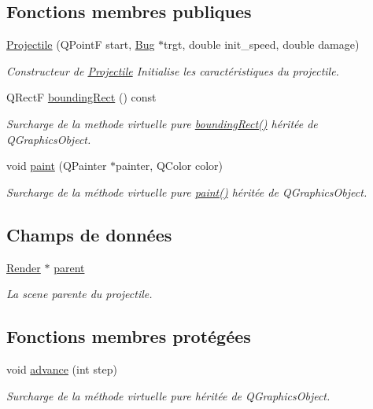 \subsection*{Fonctions membres publiques}
\begin{DoxyCompactItemize}
\item 
\hyperlink{classProjectile_adb1e35e75922feb87c3391f549d3274f}{Projectile} (QPointF start, \hyperlink{classBug}{Bug} $\ast$trgt, double init\_\-speed, double damage)
\begin{DoxyCompactList}\small\item\em Constructeur de \hyperlink{classProjectile}{Projectile} Initialise les caractéristiques du projectile. \end{DoxyCompactList}\item 
QRectF \hyperlink{classProjectile_a0e0b18909c9c154404384707c6515802}{boundingRect} () const 
\begin{DoxyCompactList}\small\item\em Surcharge de la methode virtuelle pure \hyperlink{classProjectile_a0e0b18909c9c154404384707c6515802}{boundingRect()} héritée de QGraphicsObject. \end{DoxyCompactList}\item 
void \hyperlink{classProjectile_aef0d6ffcea7620988cf5446d0c1133fa}{paint} (QPainter $\ast$painter, QColor color)
\begin{DoxyCompactList}\small\item\em Surcharge de la méthode virtuelle pure \hyperlink{classProjectile_aef0d6ffcea7620988cf5446d0c1133fa}{paint()} héritée de QGraphicsObject. \end{DoxyCompactList}\end{DoxyCompactItemize}
\subsection*{Champs de données}
\begin{DoxyCompactItemize}
\item 
\hyperlink{classRender}{Render} $\ast$ \hyperlink{classProjectile_a04924a3bccf3393aaa0f57d9384f617d}{parent}
\begin{DoxyCompactList}\small\item\em La scene parente du projectile. \end{DoxyCompactList}\end{DoxyCompactItemize}
\subsection*{Fonctions membres protégées}
\begin{DoxyCompactItemize}
\item 
void \hyperlink{classProjectile_a8e3b4bae49558a0febfce8c1accea72d}{advance} (int step)
\begin{DoxyCompactList}\small\item\em Surcharge de la méthode virtuelle pure héritée de QGraphicsObject. \end{DoxyCompactList}\end{DoxyCompactItemize}
